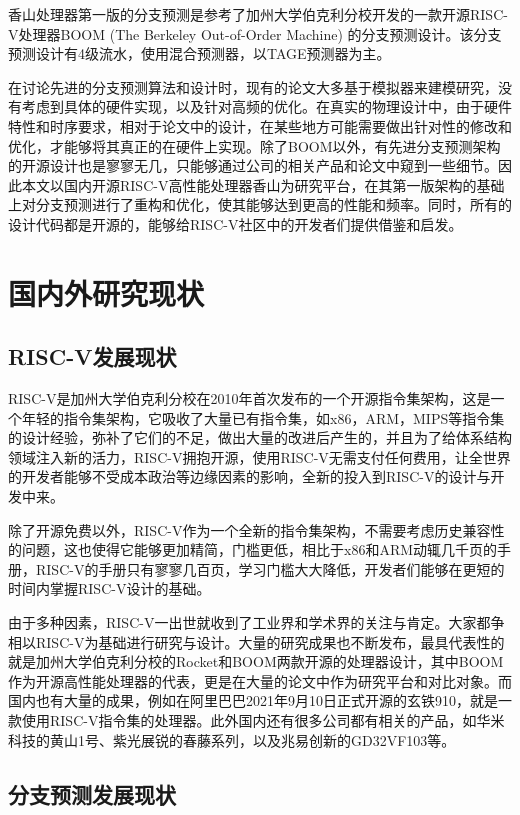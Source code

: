 香山处理器第一版的分支预测是参考了加州大学伯克利分校开发的一款开源RISC-V处理器BOOM (The Berkeley Out-of-Order Machine) 的分支预测设计。该分支预测设计有4级流水，使用混合预测器，以TAGE预测器为主。

在讨论先进的分支预测算法和设计时，现有的论文大多基于模拟器来建模研究，没有考虑到具体的硬件实现，以及针对高频的优化。在真实的物理设计中，由于硬件特性和时序要求，相对于论文中的设计，在某些地方可能需要做出针对性的修改和优化，才能够将其真正的在硬件上实现。除了BOOM以外，有先进分支预测架构的开源设计也是寥寥无几，只能够通过公司的相关产品和论文中窥到一些细节。因此本文以国内开源RISC-V高性能处理器香山为研究平台，在其第一版架构的基础上对分支预测进行了重构和优化，使其能够达到更高的性能和频率。同时，所有的设计代码都是开源的，能够给RISC-V社区中的开发者们提供借鉴和启发。

\section{国内外研究现状}


\subsection{RISC-V发展现状}
RISC-V是加州大学伯克利分校在2010年首次发布的一个开源指令集架构，这是一个年轻的指令集架构，它吸收了大量已有指令集，如x86，ARM，MIPS等指令集的设计经验，弥补了它们的不足，做出大量的改进后产生的，并且为了给体系结构领域注入新的活力，RISC-V拥抱开源，使用RISC-V无需支付任何费用，让全世界的开发者能够不受成本政治等边缘因素的影响，全新的投入到RISC-V的设计与开发中来。

除了开源免费以外，RISC-V作为一个全新的指令集架构，不需要考虑历史兼容性的问题，这也使得它能够更加精简，门槛更低，相比于x86和ARM动辄几千页的手册，RISC-V的手册只有寥寥几百页，学习门槛大大降低，开发者们能够在更短的时间内掌握RISC-V设计的基础。

由于多种因素，RISC-V一出世就收到了工业界和学术界的关注与肯定。大家都争相以RISC-V为基础进行研究与设计。大量的研究成果也不断发布，最具代表性的就是加州大学伯克利分校的Rocket和BOOM两款开源的处理器设计，其中BOOM作为开源高性能处理器的代表，更是在大量的论文中作为研究平台和对比对象。而国内也有大量的成果，例如在阿里巴巴2021年9月10日正式开源的玄铁910，就是一款使用RISC-V指令集的处理器。此外国内还有很多公司都有相关的产品，如华米科技的黄山1号、紫光展锐的春藤系列，以及兆易创新的GD32VF103等。

\subsection{分支预测发展现状}

